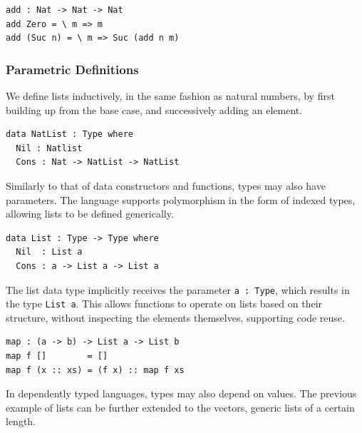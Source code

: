 \documentclass[a4paper]{article}
\begin{document}
\begin{center}
\begin{verbatim}
add : Nat -> Nat -> Nat
add Zero = \ m => m
add (Suc n) = \ m => Suc (add n m)
\end{verbatim}
\end{center}



\subsubsection{Parametric Definitions}
\label{sec:org62c4f95}

We define lists inductively, in the same fashion as natural numbers, by
first building up from the base case, and successively adding an element.

\begin{center}
\begin{verbatim}
data NatList : Type where
  Nil : Natlist
  Cons : Nat -> NatList -> NatList 
\end{verbatim}
\end{center}

Similarly to that of data constructors and functions, types may 
also have parameters. The language supports polymorphism in the form of
indexed types, allowing lists to be defined generically. 

\begin{center}
\begin{verbatim}
data List : Type -> Type where
  Nil  : List a
  Cons : a -> List a -> List a
\end{verbatim}
\end{center}

The list data type implicitly receives the parameter \texttt{a : Type}, which 
results in the type \texttt{List a}. This allows functions to operate on lists
based on their structure, without inspecting the elements themselves,
supporting code reuse. 

\begin{center}
\begin{verbatim}
map : (a -> b) -> List a -> List b
map f []        = []
map f (x :: xs) = (f x) :: map f xs
\end{verbatim}
\end{center}

In dependently typed languages, types may also depend on values.
The previous example of lists can be further extended to the vectors,
generic lists of a certain length. 
\end{document}
